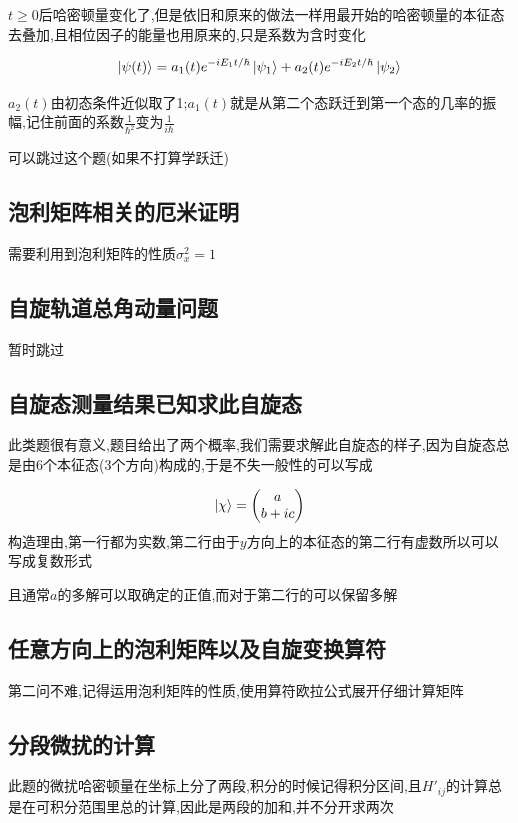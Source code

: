 \documentclass{article}
\begin{document}
            $t \ge 0$后哈密顿量变化了,但是依旧和原来的做法一样用最开始的哈密顿量的本征态去叠加,且相位因子的能量也用原来的,只是系数为含时变化

            $$
            \ket{\psi(t)} = a_{1}(t) e^{-iE_{1}t/\hbar}\ket{\psi_{1}} + a_{2}(t)e^{-iE_{2}t/\hbar}\ket{\psi_{2}}
            $$

            $a_{2}(t)$由初态条件近似取了1;$a_{1}(t)$就是从第二个态跃迁到第一个态的几率的振幅,记住前面的系数$\frac{1}{\hbar^{2}}$变为$\frac{1}{i \hbar}$

            可以跳过这个题(如果不打算学跃迁)

        \subsection{泡利矩阵相关的厄米证明}
            需要利用到泡利矩阵的性质$\sigma_{x}^{2} = 1$

        \subsection{自旋轨道总角动量问题}
            暂时跳过

        \subsection{自旋态测量结果已知求此自旋态}
            此类题很有意义,题目给出了两个概率,我们需要求解此自旋态的样子,因为自旋态总是由6个本征态(3个方向)构成的,于是不失一般性的可以写成

            $$
            \ket{\chi} = \mqty( a \\ b+ic )
            $$
            构造理由,第一行都为实数,第二行由于$y$方向上的本征态的第二行有虚数所以可以写成复数形式

            且通常$a$的多解可以取确定的正值,而对于第二行的可以保留多解

        \subsection{任意方向上的泡利矩阵以及自旋变换算符}
            第二问不难,记得运用泡利矩阵的性质,使用算符欧拉公式展开仔细计算矩阵

        \subsection{分段微扰的计算}
            此题的微扰哈密顿量在坐标上分了两段,积分的时候记得积分区间,且$H'_{ij}$的计算总是在可积分范围里总的计算,因此是两段的加和,并不分开求两次
\end{document}
